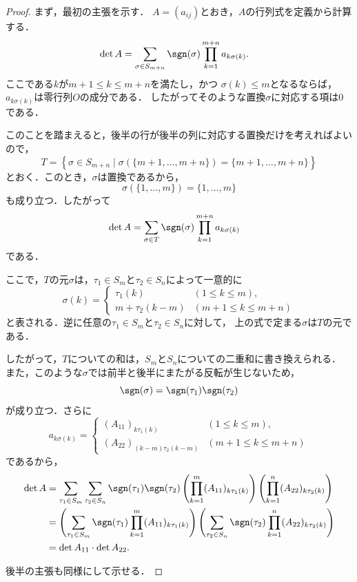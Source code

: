 \begin{leftbar}
\begin{proof}
  まず，最初の主張を示す．
  $A=(a_{ij})$とおき，$A$の行列式を定義から計算する．
  \begin{align*}
    \det A
    &=
    \sum_{\sigma \in S_{m+n}} \sgn(\sigma)
    \prod_{k=1}^{m+n} a_{k\sigma(k)}.
  \end{align*}
  ここである$k$が$m+1 \le k \le m+n$を満たし，かつ
  $\sigma(k) \le m$となるならば，$a_{k\sigma(k)}$は零行列$O$の成分である．
  したがってそのような置換$\sigma$に対応する項は$0$である．

  このことを踏まえると，後半の行が後半の列に対応する置換だけを考えればよいので，
  \[
    T=
    \left\{
      \sigma \in S_{m+n}
      \mid
      \sigma(\{m+1,\dots,m+n\})=\{m+1,\dots,m+n\}
    \right\}
  \]
  とおく．このとき，$\sigma$は置換であるから，
  \[
    \sigma(\{1,\dots,m\})=\{1,\dots,m\}
  \]
  も成り立つ．したがって
  \begin{align*}
    \det A
    &=
    \sum_{\sigma \in T}
    \sgn(\sigma)
    \prod_{k=1}^{m+n} a_{k\sigma(k)}
  \end{align*}
  である．

  ここで，$T$の元$\sigma$は，$\tau_1 \in S_m$と$\tau_2 \in S_n$によって一意的に
  \[
    \sigma(k) =
    \begin{cases}
      \tau_1(k) & (1 \le k \le m),\\
      m + \tau_2(k-m) & (m+1 \le k \le m+n)
    \end{cases}
  \]
  と表される．逆に任意の$\tau_1 \in S_m$と$\tau_2 \in S_n$に対して，
  上の式で定まる$\sigma$は$T$の元である．

  したがって，$T$についての和は，$S_m$と$S_n$についての二重和に書き換えられる．
  また，このような$\sigma$では前半と後半にまたがる反転が生じないため，
  \[
    \sgn(\sigma)=\sgn(\tau_1)\sgn(\tau_2)
  \]
  が成り立つ．さらに
  \[
    a_{k\sigma(k)} =
    \begin{cases}
      (A_{11})_{k\tau_1(k)} & (1 \le k \le m),\\
      (A_{22})_{(k-m)\tau_2(k-m)} & (m+1 \le k \le m+n)
    \end{cases}
  \]
  であるから，
  \begin{align*}
    \det A
    &=
    \sum_{\tau_1\in S_m}
    \sum_{\tau_2\in S_n}
    \sgn(\tau_1)\sgn(\tau_2)
    \left(
      \prod_{k=1}^{m} (A_{11})_{k\tau_1(k)}
    \right)
    \left(
      \prod_{k=1}^{n} (A_{22})_{k\tau_2(k)}
    \right) \\
    &=
    \left(
      \sum_{\tau_1\in S_m}
      \sgn(\tau_1)
      \prod_{k=1}^{m} (A_{11})_{k\tau_1(k)}
    \right)
    \left(
      \sum_{\tau_2\in S_n}
      \sgn(\tau_2)
      \prod_{k=1}^{n} (A_{22})_{k\tau_2(k)}
    \right) \\
    &= \det A_{11} \cdot \det A_{22}.
  \end{align*}

  後半の主張も同様にして示せる．
\end{proof}
\end{leftbar}

